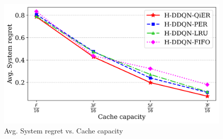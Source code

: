\documentclass[journal]{IEEEtran}
\begin{document}

\begin{figure}[htbp]
    \centering
    \includegraphics[width=\linewidth]{MinMax Cost Scaled/IEEE_avg_COST_vs_cache_capacity_lineplot.png}  %
    \caption{Avg. System regret vs. Cache capacity}
    \label{fig:avg_system_regret_vs_cache_capacity}
\end{figure}

\end{document}
